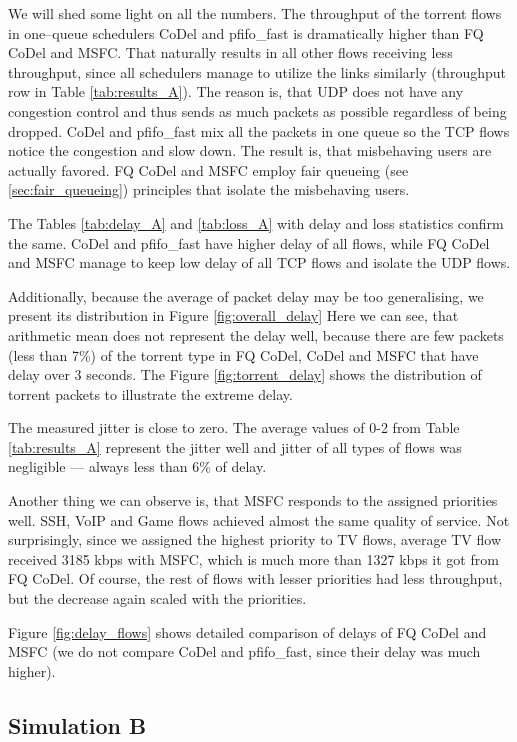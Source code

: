 We will shed some light on all the numbers. The throughput of the torrent flows in one--queue schedulers CoDel and pfifo\_fast is dramatically higher than FQ CoDel and MSFC. That naturally results in all other flows receiving less throughput, since all schedulers manage to utilize the links similarly (throughput row in Table \ref{tab:results_A}). The reason is, that UDP does not have any congestion control and thus sends as much packets as possible regardless of being dropped. CoDel and pfifo\_fast mix all the packets in one queue so the TCP flows notice the congestion and slow down. The result is, that misbehaving users are actually favored. FQ CoDel and MSFC employ fair queueing (see \autoref{sec:fair_queueing}) principles that isolate the misbehaving users.

The Tables \ref{tab:delay_A} and \ref{tab:loss_A} with delay and loss statistics confirm the same. CoDel and pfifo\_fast have higher delay of all flows, while FQ CoDel and MSFC manage to keep low delay of all TCP flows and isolate the UDP flows. 

Additionally, because the average of packet delay may be too generalising, we present its distribution in Figure \ref{fig:overall_delay} Here we can see, that arithmetic mean does not represent the delay well, because there are few packets (less than 7\%) of the torrent type in FQ CoDel, CoDel and MSFC that have delay over 3 seconds. The Figure \ref{fig:torrent_delay} shows the distribution of torrent packets to illustrate the extreme delay.

The measured jitter is close to zero. The average values of 0-2 from Table \ref{tab:results_A} represent the jitter well and jitter of all types of flows was negligible --- always less than 6\% of delay.

Another thing we can observe is, that MSFC responds to the assigned priorities well. SSH, VoIP and Game flows achieved almost the same quality of service. Not surprisingly, since we assigned the highest priority to TV flows, average TV flow received 3185 kbps with MSFC, which is much more than 1327 kbps it got from FQ CoDel. Of course, the rest of flows with lesser priorities had less throughput, but the decrease again scaled with the priorities.

Figure \ref{fig:delay_flows} shows detailed comparison of delays of FQ CoDel and MSFC (we do not compare CoDel and pfifo\_fast, since their delay was much higher).

\subsection{Simulation B}




